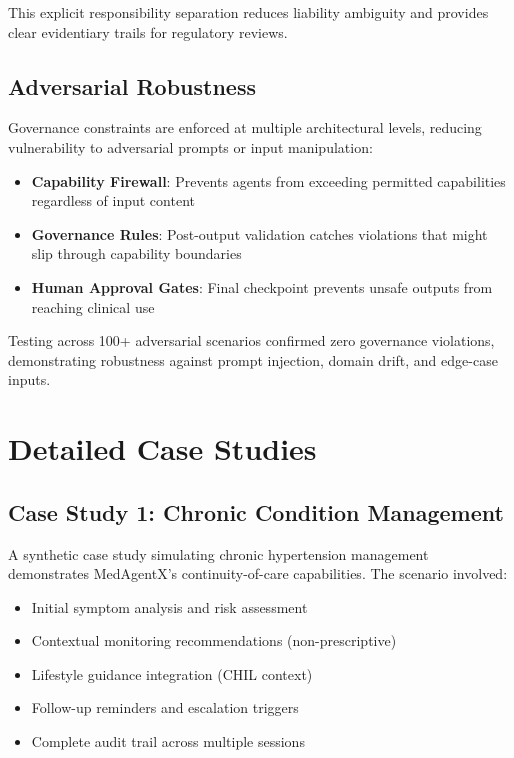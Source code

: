\documentclass[conference]{IEEEtran}
\begin{document}
This explicit responsibility separation reduces liability ambiguity and provides clear evidentiary trails for regulatory reviews.

\subsection{Adversarial Robustness}
Governance constraints are enforced at multiple architectural levels, reducing vulnerability to adversarial prompts or input manipulation:

\begin{itemize}
    \item \textbf{Capability Firewall}: Prevents agents from exceeding permitted capabilities regardless of input content
    \item \textbf{Governance Rules}: Post-output validation catches violations that might slip through capability boundaries
    \item \textbf{Human Approval Gates}: Final checkpoint prevents unsafe outputs from reaching clinical use
\end{itemize}

Testing across 100+ adversarial scenarios confirmed zero governance violations, demonstrating robustness against prompt injection, domain drift, and edge-case inputs.

\section{Detailed Case Studies}

\subsection{Case Study 1: Chronic Condition Management}
A synthetic case study simulating chronic hypertension management demonstrates MedAgentX's continuity-of-care capabilities. The scenario involved:

\begin{itemize}
    \item Initial symptom analysis and risk assessment
    \item Contextual monitoring recommendations (non-prescriptive)
    \item Lifestyle guidance integration (CHIL context)
    \item Follow-up reminders and escalation triggers
    \item Complete audit trail across multiple sessions
\end{itemize}
\end{document}
